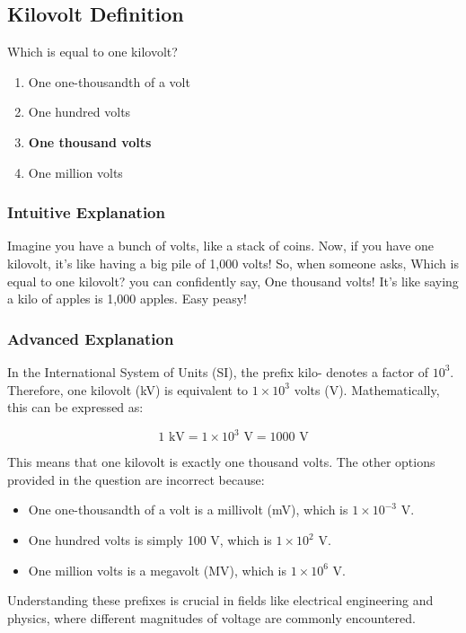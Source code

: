 \subsection{Kilovolt Definition}
\label{T5B03}

\begin{tcolorbox}[colback=gray!10!white,colframe=black!75!black,title=T5B03]
Which is equal to one kilovolt?
\begin{enumerate}[label=\Alph*)]
    \item One one-thousandth of a volt
    \item One hundred volts
    \item \textbf{One thousand volts}
    \item One million volts
\end{enumerate}
\end{tcolorbox}

\subsubsection{Intuitive Explanation}
Imagine you have a bunch of volts, like a stack of coins. Now, if you have one kilovolt, it's like having a big pile of 1,000 volts! So, when someone asks, Which is equal to one kilovolt? you can confidently say, One thousand volts! It's like saying a kilo of apples is 1,000 apples. Easy peasy!

\subsubsection{Advanced Explanation}
In the International System of Units (SI), the prefix kilo- denotes a factor of \(10^3\). Therefore, one kilovolt (kV) is equivalent to \(1 \times 10^3\) volts (V). Mathematically, this can be expressed as:

\[
1 \text{ kV} = 1 \times 10^3 \text{ V} = 1000 \text{ V}
\]

This means that one kilovolt is exactly one thousand volts. The other options provided in the question are incorrect because:
\begin{itemize}
    \item One one-thousandth of a volt is a millivolt (mV), which is \(1 \times 10^{-3}\) V.
    \item One hundred volts is simply 100 V, which is \(1 \times 10^2\) V.
    \item One million volts is a megavolt (MV), which is \(1 \times 10^6\) V.
\end{itemize}

Understanding these prefixes is crucial in fields like electrical engineering and physics, where different magnitudes of voltage are commonly encountered.

